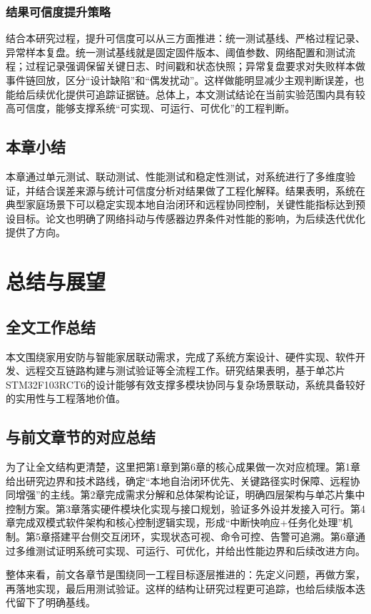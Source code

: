 \documentclass[UTF8,12pt,a4paper,oneside]{ctexbook}
\numberwithin{equation}{chapter}
\begin{document}
\subsection{结果可信度提升策略}
结合本研究过程，提升可信度可以从三方面推进：统一测试基线、严格过程记录、异常样本复盘。统一测试基线就是固定固件版本、阈值参数、网络配置和测试流程；过程记录强调保留关键日志、时间戳和状态快照；异常复盘要求对失败样本做事件链回放，区分“设计缺陷”和“偶发扰动”。这样做能明显减少主观判断误差，也能给后续优化提供可追踪证据链。总体上，本文测试结论在当前实验范围内具有较高可信度，能够支撑系统“可实现、可运行、可优化”的工程判断。

\section{本章小结}
本章通过单元测试、联动测试、性能测试和稳定性测试，对系统进行了多维度验证，并结合误差来源与统计可信度分析对结果做了工程化解释。结果表明，系统在典型家庭场景下可以稳定实现本地自治闭环和远程协同控制，关键性能指标达到预设目标。论文也明确了网络抖动与传感器边界条件对性能的影响，为后续迭代优化提供了方向。

\chapter{总结与展望}
\section{全文工作总结}
本文围绕家用安防与智能家居联动需求，完成了系统方案设计、硬件实现、软件开发、远程交互链路构建与测试验证等全流程工作。研究结果表明，基于单芯片STM32F103RCT6的设计能够有效支撑多模块协同与复杂场景联动，系统具备较好的实用性与工程落地价值。
\section{与前文章节的对应总结}
为了让全文结构更清楚，这里把第1章到第6章的核心成果做一次对应梳理。第1章给出研究边界和技术路线，确定“本地自治闭环优先、关键路径实时保障、远程协同增强”的主线。第2章完成需求分解和总体架构论证，明确四层架构与单芯片集中控制方案。第3章落实硬件模块化实现与接口规划，验证多外设并发接入可行。第4章完成双模式软件架构和核心控制逻辑实现，形成“中断快响应+任务化处理”机制。第5章搭建平台侧交互闭环，实现状态可视、命令可控、告警可追溯。第6章通过多维测试证明系统可实现、可运行、可优化，并给出性能边界和后续改进方向。

整体来看，前文各章节是围绕同一工程目标逐层推进的：先定义问题，再做方案，再落地实现，最后用测试验证。这样的结构让研究过程更可追踪，也给后续版本迭代留下了明确基线。
\end{document}

